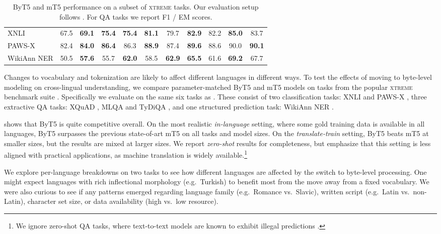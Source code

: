 \documentclass[11pt,a4paper]{article}
\begin{document}
\begin{table*}[t!]
{\begin{tabular}{l cc cc cc cc cc}
\midrule XNLI   & 67.5        & \textbf{69.1}        & \textbf{75.4}                 & \textbf{75.4}        & \textbf{81.1}        & 79.7        & \textbf{82.9}        & 82.2        & \textbf{85.0}        & 83.7          \\
PAWS-X  & 82.4        & \textbf{84.0}          & \textbf{86.4}                 & 86.3                 & \textbf{88.9}        & 87.4        & \textbf{89.6}        & 88.6        & 90.0                 & \textbf{90.1} \\
WikiAnn NER & 50.5        & \textbf{57.6} & 55.7        & \textbf{62.0} & 58.5        & \textbf{62.9} & \textbf{65.5} & 61.6        & \textbf{69.2} & 67.7 \\
\bottomrule
\end{tabular}
}
\caption{ByT5 and mT5 performance on a subset of \textsc{xtreme} tasks. Our evaluation setup follows \citet{mt5}. For QA tasks we report F1 / EM scores.}
\label{tab:xtreme}
\end{table*} 
Changes to vocabulary and tokenization are likely to affect different languages in different ways. To test the effects of moving to byte-level modeling on cross-lingual understanding, we compare parameter-matched ByT5 and mT5 models on tasks from the popular \textsc{xtreme} benchmark suite \cite{hu_2020_xtreme}. Specifically we evaluate on the same six tasks as \citet{mt5}. These consist of two classification tasks: XNLI \cite{conneau2018xnli} and \mbox{PAWS-X} \cite{yang-etal-2019-paws}, three extractive QA tasks: XQuAD \cite{artetxe-etal-2020-cross}, MLQA \cite{lewis-etal-2020-mlqa} and TyDiQA \cite{clark-etal-2020-tydi}, and one structured prediction task: WikiAnn NER \cite{pan-etal-2017-cross}.

 shows that ByT5 is quite competitive overall. On the most realistic \textit{in-language} setting, where some gold training data is available in all languages, ByT5 surpasses the previous state-of-art mT5 on all tasks and model sizes. On the \textit{translate-train} setting, ByT5 beats mT5 at smaller sizes, but the results are mixed at larger sizes. We report \textit{zero-shot} results for completeness, but emphasize that this setting is less aligned with practical applications, as machine translation is widely available.\footnote{We ignore zero-shot QA tasks, where text-to-text models are known to exhibit illegal predictions \cite{mt5}.} 

We explore per-language breakdowns on two tasks to see how different languages are affected by the switch to byte-level processing. One might expect languages with rich inflectional morphology (e.g.~Turkish) to benefit most from the move away from a fixed vocabulary. We were also curious to see if any patterns emerged regarding language family (e.g.~Romance vs.~Slavic), written script (e.g.~Latin vs.~non-Latin), character set size, or data availability (high vs.~low resource).
\end{document}
